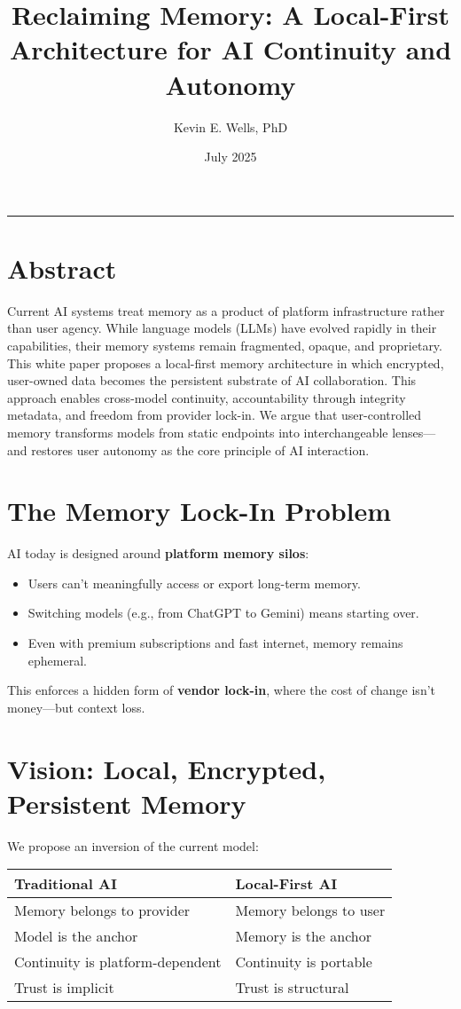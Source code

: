 \documentclass[11pt]{article}
\title{\textbf{Reclaiming Memory: A Local-First Architecture for AI Continuity and Autonomy}}
\author{Kevin E. Wells, PhD}
\date{July 2025}
\begin{document}
\maketitle
\hrule
\vspace{1em}

\section*{Abstract}
Current AI systems treat memory as a product of platform infrastructure rather than user agency. While language models (LLMs) have evolved rapidly in their capabilities, their memory systems remain fragmented, opaque, and proprietary. This white paper proposes a local-first memory architecture in which encrypted, user-owned data becomes the persistent substrate of AI collaboration. This approach enables cross-model continuity, accountability through integrity metadata, and freedom from provider lock-in. We argue that user-controlled memory transforms models from static endpoints into interchangeable lenses—and restores user autonomy as the core principle of AI interaction.

\section{The Memory Lock-In Problem}
AI today is designed around \textbf{platform memory silos}:
\begin{itemize}[nosep]
    \item Users can't meaningfully access or export long-term memory.
    \item Switching models (e.g., from ChatGPT to Gemini) means starting over.
    \item Even with premium subscriptions and fast internet, memory remains ephemeral.
\end{itemize}
This enforces a hidden form of \textbf{vendor lock-in}, where the cost of change isn't money—but context loss.

\section{Vision: Local, Encrypted, Persistent Memory}
We propose an inversion of the current model:

\begin{center}
\begin{tabular}{@{}ll@{}}
\toprule
\textbf{Traditional AI} & \textbf{Local-First AI} \\
\midrule
Memory belongs to provider & Memory belongs to user \\
Model is the anchor & Memory is the anchor \\
Continuity is platform-dependent & Continuity is portable \\
Trust is implicit & Trust is structural \\
\bottomrule
\end{tabular}
\end{center}
\end{document}

